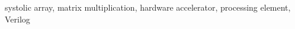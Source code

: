 
\begin{abstract}
To be written in \#5.
\end{abstract}

\begin{IEEEkeywords}
systolic array, matrix multiplication, hardware accelerator, processing element, Verilog
\end{IEEEkeywords}

